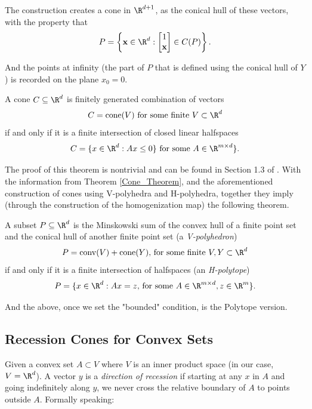 \documentclass{TC}
\begin{document}
The construction creates a cone in $\R^{d+1}$, as the conical hull of these vectors, with the property that $$ P = \left \{ \mathbf x \in \R^d : \begin{bmatrix}
1 \\ \mathbf x
\end{bmatrix} \in C(P)\right \}.$$

And the points at infinity (the part of $P$ that is defined using the conical hull of $Y$) is recorded on the plane $x_0 = 0$.

\begin{theorem} \label{Cone_Theorem}


A cone $C \subseteq \R^d$ is finitely generated combination of vectors $$ C = \mathrm{cone}(V) \text{ for some finite } V \subset \R^d $$
if and only if it is a finite intersection of closed linear halfspaces
$$ C = \{x \in \R^d : Ax \leq 0\} \text{ for some } A \in \R^{m \times d}\} .$$
\end{theorem}

The proof of this theorem is nontrivial and can be found in Section 1.3 of \cite{Ziegler}. With the information from Theorem \ref{Cone_Theorem}, and the aforementioned construction of cones using V-polyhedra and H-polyhedra, together they imply (through the construction of the homogenization map) the following theorem. 


\begin{theorem}
A subset $P \subseteq \R^d$ is the Minskowski sum of the convex hull of a finite point set and the conical hull of another finite point set (a \emph{V-polyhedron}) $$ P = \mathrm{conv}(V) + \mathrm{cone}(Y) \text{, for some finite } V,Y \subset \R^d$$ if and only if it is a finite intersection of halfspaces (an \emph{H-polytope})
$$ P = \{x \in \R^d : A x  = z \text{, for some } A \in \R^{m\times d}, z \in \R^m \}.$$

\end{theorem}

And the above, once we set the "bounded" condition, is the Polytope version.

\subsection{Recession Cones for Convex Sets}
Given a convex set $A \subset V$ where $V$ is an inner product space (in our case, $V = \R^d$). A vector $y$ is a \emph{direction of recession} if starting at any $x$ in $A$ and going indefinitely along $y$, we never cross the relative boundary of $A$ to points outside $A$. Formally speaking:
\end{document}
